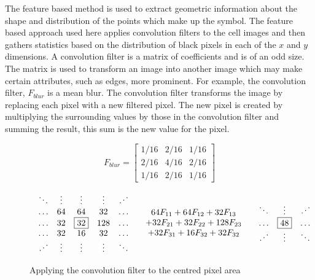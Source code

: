 
The feature based method is used to extract geometric information about the
shape and distribution of the points which make up the symbol.  The feature
based approach used here applies convolution filters to the cell images and
then gathers statistics based on the distribution of black pixels in each of
the $x$ and $y$ dimensions. A convolution filter is a matrix of coefficients
and is of an odd size. The matrix is used to transform an image into another
image which may make certain attributes, such as edges, more prominent.  For
example, the convolution filter, $F_{blur}$ is a mean blur. The convolution
filter transforms the image by replacing each pixel with a new filtered pixel.
The new pixel is created by multiplying the surrounding values by those in the
convolution filter and summing the result, this sum is the new value for the
pixel.

\[ F_{blur} = \left[
\begin{array}{ccc}
1/16 & 2/16 & 1/16 \\
2/16 & 4/16 & 2/16 \\
1/16 & 2/16 & 1/16
\end{array}\right] \]

\begin{figure}[h] \[
\begin{array}{lcr}
\begin{array}{ccccc}
\ddots & \vdots & \vdots & \vdots & \iddots \\
\ldots & 64 & 64 & 32 & \ldots \\
\ldots & 32 & \fbox{32} & 128 & \ldots \\
\ldots & 32 & 16 & 32 & \ldots \\
\iddots & \vdots & \vdots & \vdots & \ddots \\
\end{array} &
\begin{array}{c}
64F_{11} + 64F_{12} + 32F_{13} \\
+ 32F_{21} + 32F_{22} + 128F_{23} \\
+ 32F_{31} + 16F_{32} + 32F_{32} \\
\end{array} &
\begin{array}{ccccc}
\ddots & \vdots & \iddots \\
\ldots &  \fbox{48}  & \ldots \\
\iddots & \vdots & \ddots \\
\end{array}
\end{array} \]
\caption{Applying the convolution filter to the centred pixel area}
\label{figure:convolution}
\end{figure}

